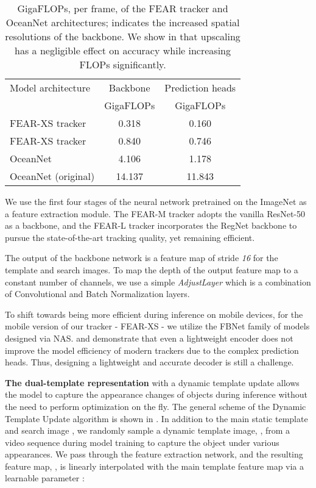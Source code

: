 \documentclass[runningheads]{llncs}
\begin{document}
\begin{table}[h]
\renewcommand{\arraystretch}{0.95}
\centering
\begin{tabular}{l||c|c}
Model architecture & Backbone & Prediction heads\\
 & GigaFLOPs & GigaFLOPs\\
\hline
FEAR-XS tracker & 0.318 & 0.160\\
FEAR-XS tracker  & 0.840 & 0.746\\
OceanNet & 4.106 & 1.178 \\
OceanNet  (original) & 14.137 & 11.843 \\
\end{tabular}
\vspace{0.75em}
\caption{GigaFLOPs, per frame, of the FEAR tracker and OceanNet \cite{Ocean} architectures;  indicates the increased spatial resolutions of the backbone. We show in  that upscaling has a negligible effect on accuracy while increasing FLOPs significantly.} 
\label{t:flops}
\end{table} 
We use the first four stages of the neural network pretrained on the ImageNet \cite{ImageNet} as a feature extraction module. 
The FEAR-M tracker adopts the vanilla ResNet-50 \cite{ResNet} as a backbone, and the FEAR-L tracker incorporates the RegNet \cite{xu2021regnet} backbone to pursue the state-of-the-art tracking quality, yet remaining efficient.

The output of the backbone network is a feature map of stride \textit{16} for the template and search images. 
To map the depth of the output feature map to a constant number of channels, we use a simple \textit{AdjustLayer} which is a combination of Convolutional and Batch Normalization \cite{BatchNorm} layers. 

To shift towards being more efficient during inference on mobile devices, for the mobile version of our tracker - FEAR-XS - we utilize the FBNet \cite{FBNet} family of models designed via NAS.  and  demonstrate that even a lightweight encoder does not improve the model efficiency of modern trackers due to the complex prediction heads. Thus, designing a lightweight and accurate decoder is still a challenge.

\textbf{The dual-template representation} with a dynamic template update allows the model to capture the appearance changes of objects during inference without the need to perform optimization on the fly. 
The general scheme of the Dynamic Template Update algorithm is shown in .
In addition to the main static template  and search image , we randomly sample a dynamic template image, , from a video sequence during model training to capture the object under various appearances. 
We pass  through the feature extraction network, and the resulting feature map, , is linearly interpolated with the main template feature map  via a learnable parameter :
\end{document}
